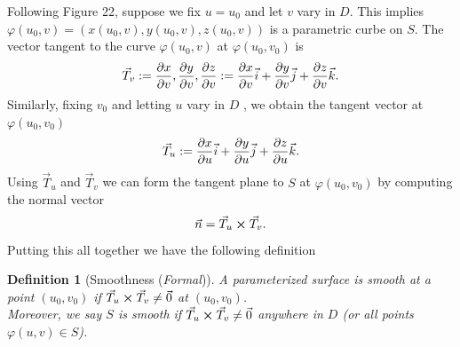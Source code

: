 \documentclass[
	12pt,
	]{article}
\theoremstyle{custom}
\theoremstyle{custom}
\theoremstyle{custom}
\theoremstyle{custom}
\newtheorem{definition}{Definition}[section]
\theoremstyle{custom}
\theoremstyle{definition}
\theoremstyle{example}
\theoremstyle{note}
\theoremstyle{remark}
\theoremstyle{example}
\newcounter{theo}[section]\setcounter{theo}{0}
\numberwithin{equation}{subsection}
\begin{document}
				\noindent Following Figure 22, suppose we fix $u=u_{0}$ and let $v$ vary in $D$. This implies $\varphi(u_{0},v) = (x(u_{0},v) , y(u_{0} , v) ,z(u_0 , v))$ is a parametric curbe on $S$. The vector tangent to the curve $\varphi(u_{0} , v)$ at $\varphi(u_{0} , v_{0})$ is 
				\begin{align*} 
				\vec{T}_{v} := \pdv{x}{v}(u_{0}, v_{0}) ,\pdv{y}{v} (u_{0} ,v_{0}) , \pdv{z}{v}(u_{0},v_{0}) := \pdv{x}{v}(u_{0}, v_{0})\vec{i} + \pdv{y}{v} (u_{0} ,v_{0})\vec{j} + \pdv{z}{v}(u_{0},v_{0})\vec{k}.
				\end{align*}
				Similarly, fixing $v_{0}$ and letting $u$ vary in $D$ , we obtain the tangent vector at $\varphi(u_{0},v_{0})$
				$$ \vec{T}_{u} := \pdv{x}{u}(u_{0}, v_{0})\vec{i} + \pdv{y}{u} (u_{0} ,v_{0})\vec{j} + \pdv{z}{u}(u_{0},v_{0})\vec{k}.$$
				Using $\vec{T}_{u}$ and $\vec{T}_{v}$ we can form the tangent plane to $S$ at $\varphi(u_{0} , v_{0})$ by computing the normal vector 
				$$ \vec{n} = \vec{T}_{u} \cross \vec{T}_{v}.$$
				Putting this all together we have the following definition 
				\begin{definition}[Smoothness (\textit{Formal})]
					A parameterized surface is smooth at a point $(u_{0},v_{0})$ if $\vec{T}_{u}\cross \vec{T}_{v} \neq \vec{0}$ at $(u_{0},v_{0})$. \\
					
					\noindent Moreover, we say $S$ is smooth if $\vec{T}_{u}\cross \vec{T}_{v} \neq \vec{0}$ anywhere in $D$ (or all points $\varphi(u,v) \in S$).
				\end{definition}
				
\end{document}
